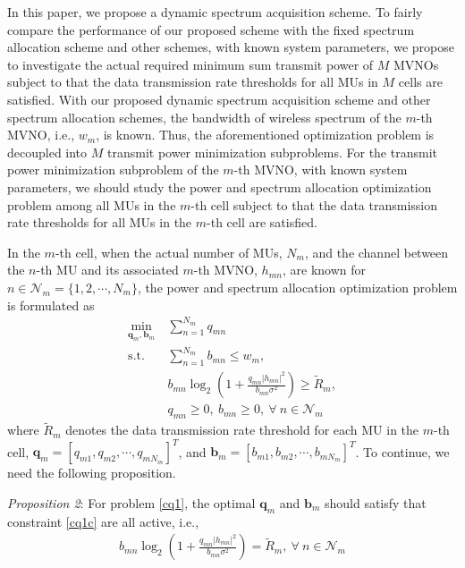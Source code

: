 \documentclass[journal]{IEEEtran}
\begin{document}
In this paper, we propose a dynamic spectrum acquisition scheme. To fairly compare the performance of our proposed scheme with the fixed spectrum allocation scheme and other schemes, with known system parameters, we propose to investigate the actual required minimum sum transmit power of $M$ MVNOs subject to that the data transmission rate thresholds for all MUs in $M$ cells are satisfied. With our proposed dynamic spectrum acquisition scheme and other spectrum allocation schemes, the bandwidth of wireless spectrum of the $m$-th MVNO, i.e., $w_m$, is known. Thus, the aforementioned optimization problem is decoupled into $M$ transmit power minimization subproblems. For the transmit power minimization subproblem of the $m$-th MVNO, with known system parameters, we should study the power and spectrum allocation optimization problem among all MUs in the $m$-th cell subject to that the data transmission rate thresholds for all MUs in the $m$-th cell are satisfied.

In the $m$-th cell, when the actual number of MUs, $N_m$, and the channel between the $n$-th MU and its associated $m$-th MVNO, $h_{mn}$, are known for $n\in\mathcal{N}_m=\{1,2,\cdots,N_m\}$, the power and spectrum allocation optimization problem is formulated as
\begin{subequations}\label{cq1}
\begin{align}
\label{cq1a} \min_{\mathbf{q}_m, \mathbf{b}_m}\ & \sum\limits_{n=1}^{N_m} q_{mn} \\
\label{cq1b}\mbox{s.t.} \quad &  \sum\limits_{n=1}^{N_m} b_{mn} \leq w_m,\\ \label{cq1c}&  b_{mn}\log_2\left(1 + \frac{q_{mn}\left|h_{mn}\right|^2}{b_{mn}\sigma^2}\right) \geq \tilde{R}_m,\\
\label{cq1d}& q_{mn} \geq 0,\ b_{mn} \geq 0,\ \forall\ n\in\mathcal{N}_m
\end{align}
\end{subequations}
where $\tilde{R}_m$ denotes the data transmission rate threshold for each
MU in the $m$-th cell, $\mathbf{q}_m=\left[q_{m1}, q_{m2}, \cdots, q_{mN_m}\right]^T$, and $\mathbf{b}_m=\left[b_{m1}, b_{m2}, \cdots, b_{mN_m}\right]^T$. To continue, we need the following proposition.

\textit{Proposition 2}: For problem \eqref{cq1}, the optimal $\mathbf{q}_m$ and $\mathbf{b}_m$ should satisfy that constraint \eqref{cq1c} are all active, i.e.,
\begin{align}
b_{mn}\log_2\left(1 + \frac{q_{mn}\left|h_{mn}\right|^2}{b_{mn}\sigma^2}\right)= \tilde{R}_m,\  \forall \ n\in\mathcal{N}_m
\end{align}
\end{document}
